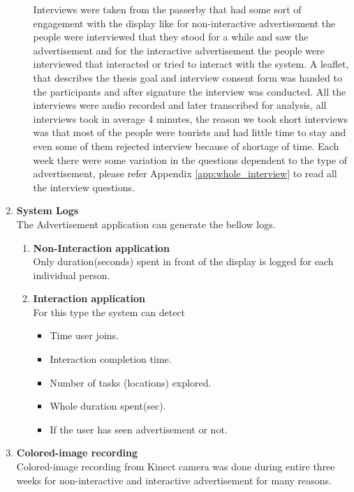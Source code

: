 \begin{enumerate}
\begin{enumerate}
Interviews were taken from the passerby that had some sort of engagement with the display like for non-interactive advertisement the people were interviewed that they stood for a while and saw the advertisement and for the interactive advertisement the people were interviewed that interacted or tried to interact with the system.
A leaflet, that describes the thesis goal and interview consent form was handed to the participants and after signature the interview was conducted. All the interviews were audio recorded and later transcribed for analysis, all interviews took in average 4 minutes, the reason we took short interviews was that most of the people were tourists and had little time to stay and even some of them rejected interview because of shortage of time.
Each week there were some variation in the questions dependent to the type of advertisement, please refer Appendix \ref{app:whole_interview} to read all the interview questions.


\end{enumerate}


\item \textbf{System Logs} \\
The Advertisement application can generate the bellow logs.
\begin{enumerate}
\item	\textbf{Non-Interaction application} \\
Only duration(seconds) spent in front of the display is logged for each individual person.

\item	\textbf{Interaction application}\\
For this type the system can detect

\begin{itemize}
\item	Time user joins.
\item	Interaction completion time.
\item	Number of tasks (locations) explored.
\item	Whole duration spent(sec).
\item	If the user has seen advertisement or not.
\end{itemize}

\end{enumerate}

\item \textbf{Colored-image recording} \\
Colored-image recording from Kinect camera was done during entire three weeks for non-interactive and interactive advertisement for many reasons.


\end{enumerate}
